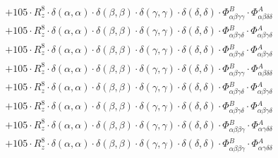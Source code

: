 \documentclass{article}
\begin{document}
\begin{subequations}
\begin{gather}
\begin{array}{c}
 \\[0.2em] 		 + 105 \cdot R_{z}^{8} \cdot \delta{}\left(\alpha{}, \alpha{}\right) \cdot \delta{}\left(\beta{}, \beta{}\right) \cdot \delta{}\left(\gamma{}, \gamma{}\right) \cdot \delta{}\left(\delta{}, \delta{}\right) \cdot \Phi{}^{B}_{\alpha{}\beta{}\gamma{}\gamma{}} \cdot \Phi{}^{A}_{\alpha{}\beta{}\delta{}\delta{}} 
 \\[0.2em] 		 + 105 \cdot R_{z}^{8} \cdot \delta{}\left(\alpha{}, \alpha{}\right) \cdot \delta{}\left(\beta{}, \beta{}\right) \cdot \delta{}\left(\gamma{}, \gamma{}\right) \cdot \delta{}\left(\delta{}, \delta{}\right) \cdot \Phi{}^{B}_{\alpha{}\beta{}\gamma{}\delta{}} \cdot \Phi{}^{A}_{\alpha{}\beta{}\gamma{}\delta{}} 
 \\[0.2em] 		 + 105 \cdot R_{z}^{8} \cdot \delta{}\left(\alpha{}, \alpha{}\right) \cdot \delta{}\left(\beta{}, \beta{}\right) \cdot \delta{}\left(\gamma{}, \gamma{}\right) \cdot \delta{}\left(\delta{}, \delta{}\right) \cdot \Phi{}^{B}_{\alpha{}\beta{}\gamma{}\delta{}} \cdot \Phi{}^{A}_{\alpha{}\beta{}\gamma{}\delta{}} 
 \\[0.2em] 		 + 105 \cdot R_{z}^{8} \cdot \delta{}\left(\alpha{}, \alpha{}\right) \cdot \delta{}\left(\beta{}, \beta{}\right) \cdot \delta{}\left(\gamma{}, \gamma{}\right) \cdot \delta{}\left(\delta{}, \delta{}\right) \cdot \Phi{}^{B}_{\alpha{}\beta{}\gamma{}\gamma{}} \cdot \Phi{}^{A}_{\alpha{}\beta{}\delta{}\delta{}} 
 \\[0.2em] 		 + 105 \cdot R_{z}^{8} \cdot \delta{}\left(\alpha{}, \alpha{}\right) \cdot \delta{}\left(\beta{}, \beta{}\right) \cdot \delta{}\left(\gamma{}, \gamma{}\right) \cdot \delta{}\left(\delta{}, \delta{}\right) \cdot \Phi{}^{B}_{\alpha{}\beta{}\gamma{}\delta{}} \cdot \Phi{}^{A}_{\alpha{}\beta{}\gamma{}\delta{}} 
 \\[0.2em] 		 + 105 \cdot R_{z}^{8} \cdot \delta{}\left(\alpha{}, \alpha{}\right) \cdot \delta{}\left(\beta{}, \beta{}\right) \cdot \delta{}\left(\gamma{}, \gamma{}\right) \cdot \delta{}\left(\delta{}, \delta{}\right) \cdot \Phi{}^{B}_{\alpha{}\beta{}\gamma{}\delta{}} \cdot \Phi{}^{A}_{\alpha{}\beta{}\gamma{}\delta{}} 
 \\[0.2em] 		 + 105 \cdot R_{z}^{8} \cdot \delta{}\left(\alpha{}, \alpha{}\right) \cdot \delta{}\left(\beta{}, \beta{}\right) \cdot \delta{}\left(\gamma{}, \gamma{}\right) \cdot \delta{}\left(\delta{}, \delta{}\right) \cdot \Phi{}^{B}_{\alpha{}\beta{}\beta{}\gamma{}} \cdot \Phi{}^{A}_{\alpha{}\gamma{}\delta{}\delta{}} 
 \\[0.2em] 		 + 105 \cdot R_{z}^{8} \cdot \delta{}\left(\alpha{}, \alpha{}\right) \cdot \delta{}\left(\beta{}, \beta{}\right) \cdot \delta{}\left(\gamma{}, \gamma{}\right) \cdot \delta{}\left(\delta{}, \delta{}\right) \cdot \Phi{}^{B}_{\alpha{}\beta{}\beta{}\gamma{}} \cdot \Phi{}^{A}_{\alpha{}\gamma{}\delta{}\delta{}} 

\end{array}
\end{gather}
\end{subequations}
\end{document}
